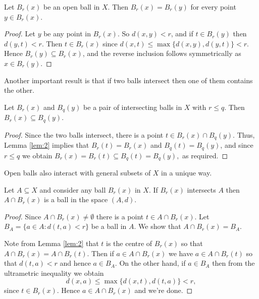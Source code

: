 \begin{lemma}
\label{lem:2}
Let \( B_{r} (x) \) be an open ball in \( X \). Then \( B_{r} (x) = B_{r} (y) \) for every point \( y \in B_{r} (x) \).
\end{lemma}
\begin{proof}
Let \( y \) be any point in \( B_{r} (x) \). So \( d(x,y) < r \), and if \( t \in B_{r}(y) \) then \( d(y,t) < r \). Then \( t \in B_{r} (x) \) since \( d(x,t) \leq \max \{ d(x,y) , d(y,t) \} < r \). Hence \( B_{r} (y) \subseteq B_{r} (x) \), and the reverse inclusion follows symmetrically as \( x \in B_{r} (y) \).
\end{proof}
Another important result is that if two balls intersect then one of them contains the other.
\begin{lemma}
\label{lem:3}
Let \( B_{r} (x) \) and \( B_{q} (y) \) be a pair of intersecting balls in \( X \) with \( r \leq q \). Then \( B_{r} (x) \subseteq B_{q} (y) \).
\end{lemma}
\begin{proof}
Since the two balls intersect, there is a point \( t \in B_{r} (x) \cap B_{q} (y) \). Thus, Lemma \ref{lem:2} implies that \( B_{r} (t) = B_{r} (x) \) and \( B_{q} (t) = B_{q} (y) \), and since \( r \leq q \) we obtain \( B_{r} (x) = B_{r} (t) \subseteq B_{q} (t) = B_{q} (y), \) as required.
\end{proof}
Open balls also interact with general subsets of \( X \) in a unique way.
\begin{lemma}
\label{lem:4}
Let \( A \subseteq X \) and consider any ball \(B_{r } (x) \) in \( X \). If \( B_{r } (x) \) intersects \( A \) then \( A \cap B_{r} (x) \) is a ball in the space \( (A, d) \).
\end{lemma}
\begin{proof}
Since \( A \cap B_{r} (x) \neq \emptyset \) there is a point \( t \in A \cap B_{r} (x) \). Let \( B_{A} = \{ a \in A : d(t,a) < r \} \) be a ball in \( A \). We show that \( A \cap B_{r} (x) = B_{A} \).

Note from Lemma \ref{lem:2} that \( t \) is the centre of \( B_{r } (x) \) so that \( A \cap B_{r } (x) = A \cap B_{r } (t) \). Then if \( a \in A \cap B_{r} (x) \) we have \( a \in A \cap B_{r } (t) \) so that \( d(t, a) < r \) and hence \( a \in B_{A} \). On the other hand, if \( a \in B_{A} \) then from the ultrametric inequality we obtain \[ d(x, a) \leq \max \{ d(x,t), d(t,a) \} < r , \] since \( t \in B_{r } (x) \). Hence \( a \in A \cap B_{r } (x) \) and we're done.
\end{proof}

